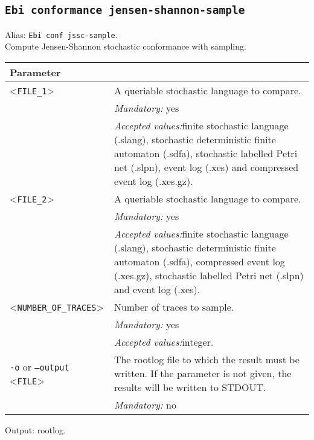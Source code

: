 {\subsection{\texttt{Ebi conformance jensen-shannon-sample}}
Alias: \texttt{Ebi conf jssc-sample}.\\
Compute Jensen-Shannon stochastic conformance with sampling.\\
\begin{tabularx}{\linewidth}{lX}
\toprule
Parameter \\\midrule
<\texttt{FILE\_1}>&A queriable stochastic language to compare.\\
&\textit{Mandatory:} \quad yes\\
&\textit{Accepted values:}\quad finite stochastic language (.slang), stochastic deterministic finite automaton (.sdfa), stochastic labelled Petri net (.slpn), event log (.xes) and compressed event log (.xes.gz).\\
<\texttt{FILE\_2}>&A queriable stochastic language to compare.\\
&\textit{Mandatory:} \quad yes\\
&\textit{Accepted values:}\quad finite stochastic language (.slang), stochastic deterministic finite automaton (.sdfa), compressed event log (.xes.gz), stochastic labelled Petri net (.slpn) and event log (.xes).\\
<\texttt{NUMBER\_OF\_TRACES}>&Number of traces to sample.\\
&\textit{Mandatory:} \quad yes\\
&\textit{Accepted values:}\quad integer.\\
\texttt{-o} or \texttt{--output} <\texttt{FILE}> &
The rootlog file to which the result must be written. If the parameter is not given, the results will be written to STDOUT.\\
&\textit{Mandatory:} \quad no\\
\bottomrule
\end{tabularx}
Output: rootlog.
}
